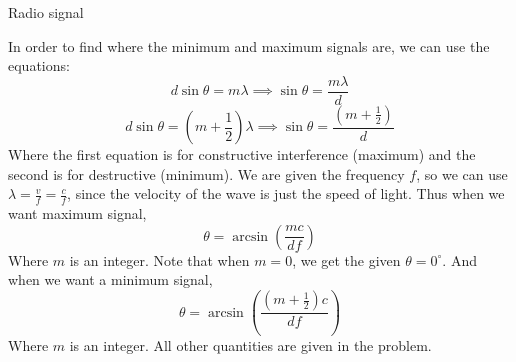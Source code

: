 \documentclass[11pt]{scrartcl}
\begin{document}
\begin{example}
  [Problem 66]
  Radio signal
\end{example}
\begin{soln}
  In order to find where the minimum and maximum signals are, we can use the equations:
  $$d\sin\theta=m\lambda\implies \sin\theta=\frac{m\lambda}{d}$$
  $$d\sin\theta=\left(m+\frac{1}{2}\right)\lambda \implies \sin\theta=\frac{\left(m+\frac{1}{2}\right)}{d}$$
  Where the first equation is for constructive interference (maximum) and the second is for destructive (minimum).
  We are given the frequency $f$, so we can use $\lambda = \frac{v}{f}=\frac{c}{f}$, since the velocity of the wave
  is just the speed of light.
  Thus when we want maximum signal,
  $$\theta=\arcsin\left(\frac{mc}{df}\right)$$
  Where $m$ is an integer. Note that when $m=0$, we get the given $\theta=0^{\circ}$.
  And when we want a minimum signal,
  $$\theta=\arcsin\left(\frac{\left(m+\frac{1}{2}\right)c}{df}\right)$$
  Where $m$ is an integer. All other quantities are given in the problem.
\end{soln}
\end{document}
